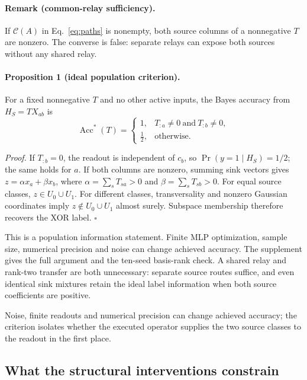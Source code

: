 \paragraph{Remark (common-relay sufficiency).}
If $\mathcal C(A)$ in Eq.~\eqref{eq:paths} is nonempty, both source columns
of a nonnegative $T$ are nonzero. The converse is false: separate relays can
expose both sources without any shared relay.

\paragraph{Proposition 1 (ideal population criterion).}
For a fixed nonnegative $T$ and no other active inputs, the Bayes accuracy
from $H_S=TX_{ab}$ is
\begin{equation}
 \operatorname{Acc}^{*}(T)=
 \begin{cases}
  1, & T_{:a}\ne0\ \text{and}\ T_{:b}\ne0,\\
  \tfrac12, & \text{otherwise}.
 \end{cases}
 \label{eq:criterion}
\end{equation}

\emph{Proof.} If $T_{:b}=0$, the readout is independent of $c_b$,
so $\Pr(y=1\mid H_S)=1/2$; the same holds for $a$.
If both columns are nonzero, summing sink vectors gives
$z=\alpha x_a+\beta x_b$, where
$\alpha=\sum_sT_{sa}>0$ and $\beta=\sum_sT_{sb}>0$.
For equal source classes, $z\in U_0\cup U_1$. For different classes,
transversality and nonzero Gaussian coordinates imply
$z\notin U_0\cup U_1$ almost surely. Subspace membership therefore
recovers the XOR label. $\square$

This is a population information statement. Finite MLP optimization,
sample size, numerical precision and noise can change achieved accuracy.
The supplement gives the full argument and the ten-seed basis-rank check.
A shared relay and rank-two transfer are both unnecessary: separate
source routes suffice, and even identical sink mixtures retain the ideal
label information when both source coefficients are positive.

Noise, finite readouts and numerical precision can change achieved accuracy;
the criterion isolates whether the executed operator supplies the two source
classes to the readout in the first place.

\subsection{What the structural interventions constrain}
\label{sec:paths}

